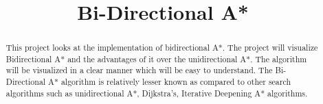 \documentclass[10pt,conference]{IEEEtran}
\begin{document}
\title{Bi-Directional A*}
\author{
}

\maketitle
\begin{abstract}
\textnormal{This project looks at the implementation of bidirectional A*. The project will visualize Bidirectional A* and the advantages of it over the unidirectional A*. The algorithm will be visualized in a clear manner which will be easy to understand. The Bi-Directional A* algorithm is relatively lesser known as compared to other search algorithms such as unidirectional A*, Dijkstra's, Iterative Deepening A* algorithms.}
\end{abstract}

\IEEEpeerreviewmaketitle
\end{document}

